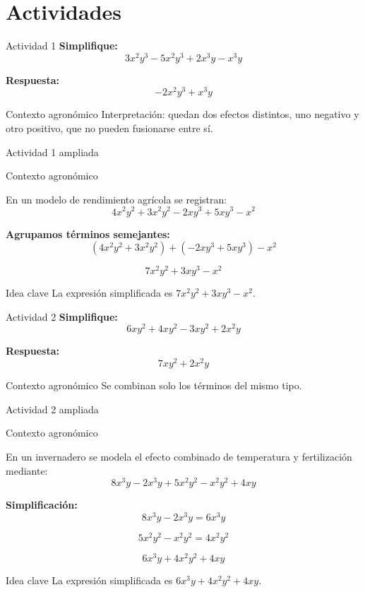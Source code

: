 \documentclass[handout,aspectratio=169,12pt]{beamer}
\newcommand{\IdeaClave}[1]{
	\begin{alertblock}{Idea clave}
		#1
	\end{alertblock}
}
\newcommand{\Agronomia}[1]{
	\begin{exampleblock}{Contexto agronómico}
		#1
	\end{exampleblock}
}
\begin{document}
	\section{Actividades}
	\begin{frame}{Actividad 1}
		\textbf{Simplifique:}
		\[
		3x^2y^3 - 5x^2y^3 + 2x^3y - x^3y
		\]
		
		\pause
		\textbf{Respuesta:}
		\[
		-2x^2y^3 + x^3y
		\]
		
		\pause
		\Agronomia{Interpretación: quedan dos efectos distintos, uno negativo y otro positivo, que no pueden fusionarse entre sí.}
	\end{frame}
	
	\begin{frame}{Actividad 1 ampliada}
		\Agronomia{
			En un modelo de rendimiento agrícola se registran:
			\[
			4x^2y^2 + 3x^2y^2 - 2xy^3 + 5xy^3 - x^2
			\]
		}
		
		\pause
		\textbf{Agrupamos términos semejantes:}
		\[
		(4x^2y^2 + 3x^2y^2)+(-2xy^3 + 5xy^3)- x^2
		\]
		
		\pause
		\[
		7x^2y^2 + 3xy^3 - x^2
		\]
		
		\pause
		\IdeaClave{La expresión simplificada es \(7x^2y^2 + 3xy^3 - x^2\).}
	\end{frame}
	
	\begin{frame}{Actividad 2}
		\textbf{Simplifique:}
		\[
		6xy^2 + 4xy^2 - 3xy^2 + 2x^2y
		\]
		
		\pause
		\textbf{Respuesta:}
		\[
		7xy^2 + 2x^2y
		\]
		
		\pause
		\Agronomia{Se combinan solo los términos del mismo tipo.}
	\end{frame}
	
	\begin{frame}{Actividad 2 ampliada}
		\Agronomia{
			En un invernadero se modela el efecto combinado de temperatura y fertilización mediante:
			\[
			8x^3y - 2x^3y + 5x^2y^2 - x^2y^2 + 4xy
			\]
		}
		
		\pause
		\textbf{Simplificación:}
		\[
		8x^3y - 2x^3y = 6x^3y
		\]
		
		\pause
		\[
		5x^2y^2 - x^2y^2 = 4x^2y^2
		\]
		
		\pause
		\[
		6x^3y + 4x^2y^2 + 4xy
		\]
		
		\pause
		\IdeaClave{La expresión simplificada es \(6x^3y + 4x^2y^2 + 4xy\).}
	\end{frame}
	
\end{document}
